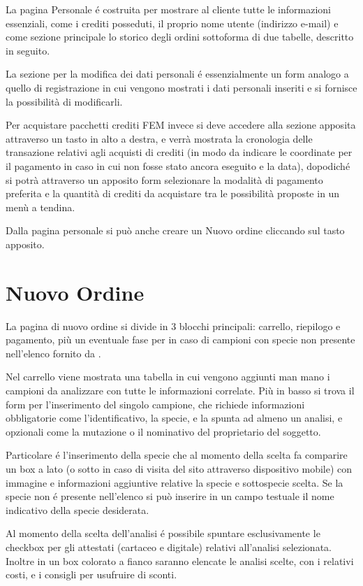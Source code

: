 La pagina Personale é costruita per mostrare al cliente tutte le informazioni essenziali, come i crediti posseduti, il proprio nome utente (indirizzo e-mail) e come sezione principale lo storico degli ordini sottoforma di due tabelle, descritto in seguito.

La sezione per la modifica dei dati personali é essenzialmente un form analogo a quello di registrazione in cui vengono mostrati i dati personali inseriti e si fornisce la possibilità di modificarli.

Per acquistare pacchetti crediti FEM invece si deve accedere alla sezione apposita attraverso un tasto in alto a destra, e verrà mostrata la cronologia delle transazione relativi agli acquisti di crediti (in modo da indicare le coordinate per il pagamento in caso in cui non fosse stato ancora eseguito e la data), dopodiché si potrà attraverso un apposito form selezionare la modalità di pagamento preferita e la quantità di crediti da acquistare tra le possibilità proposte in un menù a tendina.

Dalla pagina personale si può anche creare un \textsf{Nuovo ordine} cliccando sul tasto apposito.

\section*{Nuovo Ordine}
La pagina di nuovo ordine si divide in 3 blocchi principali: \textsf{carrello}, \textsf{riepilogo} e \textsf{pagamento}, più un eventuale fase per in caso di campioni con specie non presente nell'elenco fornito da {\fem}.

Nel \textsf{carrello} viene mostrata una tabella in cui vengono aggiunti man mano i campioni da analizzare con tutte le informazioni correlate. Più in basso si trova il form per l'inserimento del singolo campione, che richiede informazioni obbligatorie come l'identificativo, la specie, e la spunta ad almeno un analisi, e opzionali come la mutazione o il nominativo del proprietario del soggetto.

Particolare é l'inserimento della specie che al momento della scelta fa comparire un box a lato (o sotto in caso di visita del sito attraverso dispositivo mobile) con immagine e informazioni aggiuntive relative la specie e sottospecie scelta. Se la specie non é presente nell'elenco si può inserire in un campo testuale il nome indicativo della specie desiderata.

Al momento della scelta dell'analisi é possibile spuntare esclusivamente le checkbox per gli attestati (cartaceo e digitale) relativi all'analisi selezionata. Inoltre in un box colorato a fianco saranno elencate le analisi scelte, con i relativi costi, e i consigli per usufruire di sconti.

